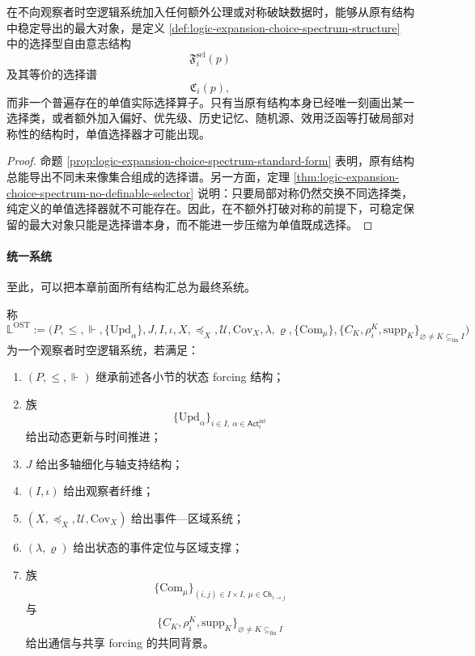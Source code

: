 \begin{corollary}[无额外对称破缺下的定义极限]\label{cor:logic-expansion-choice-spectrum-definability-limit}
在不向观察者时空逻辑系统加入任何额外公理或对称破缺数据时，能够从原有结构中稳定导出的最大对象，是定义 \ref{def:logic-expansion-choice-spectrum-structure} 中的选择型自由意志结构
\[
\mathfrak F_i^{\mathrm{sel}}(p)
\]
及其等价的选择谱
\[
\mathfrak C_i(p),
\]
而非一个普遍存在的单值实际选择算子。只有当原有结构本身已经唯一刻画出某一选择类，或者额外加入偏好、优先级、历史记忆、随机源、效用泛函等打破局部对称性的结构时，单值选择器才可能出现。
\end{corollary}

\begin{proof}
命题 \ref{prop:logic-expansion-choice-spectrum-standard-form} 表明，原有结构总能导出不同未来像集合组成的选择谱。另一方面，定理 \ref{thm:logic-expansion-choice-spectrum-no-definable-selector} 说明：只要局部对称仍然交换不同选择类，纯定义的单值选择器就不可能存在。因此，在不额外打破对称的前提下，可稳定保留的最大对象只能是选择谱本身，而不能进一步压缩为单值既成选择。
\end{proof}

\paragraph{统一系统}
至此，可以把本章前面所有结构汇总为最终系统。

\begin{definition}[观察者时空逻辑系统]\label{def:logic-expansion-ost-system}
称
\[
\mathbb{L}^{\mathrm{OST}}
:=
\bigl(
P,\le,\Vdash,\{\mathrm{Upd}_\alpha\},J,I,\iota,
X,\preceq_X,\mathcal U,\mathrm{Cov}_X,
\lambda,\varrho,\{\mathrm{Com}_\mu\},
\{C_K,\rho_i^K,\mathrm{supp}_K\}_{\varnothing\neq K\subseteq_{\mathrm{fin}} I}
\bigr)
\]
为一个观察者时空逻辑系统，若满足：
\begin{enumerate}
  \item \((P,\le,\Vdash)\) 继承前述各小节的状态 forcing 结构；
  \item 族
  \[
  \{\mathrm{Upd}_\alpha\}_{i\in I,\ \alpha\in \mathsf{Act}_i^{\mathrm{int}}}
  \]
  给出动态更新与时间推进；
  \item \(J\) 给出多轴细化与轴支持结构；
  \item \((I,\iota)\) 给出观察者纤维；
  \item \((X,\preceq_X,\mathcal U,\mathrm{Cov}_X)\) 给出事件—区域系统；
  \item \((\lambda,\varrho)\) 给出状态的事件定位与区域支撑；
  \item 族
  \[
  \{\mathrm{Com}_\mu\}_{(i,j)\in I\times I,\ \mu\in \mathsf{Ch}_{i\to j}}
  \]
  与
  \[
  \{C_K,\rho_i^K,\mathrm{supp}_K\}_{\varnothing\neq K\subseteq_{\mathrm{fin}} I}
  \]
  给出通信与共享 forcing 的共同背景。
\end{enumerate}
\end{definition}

